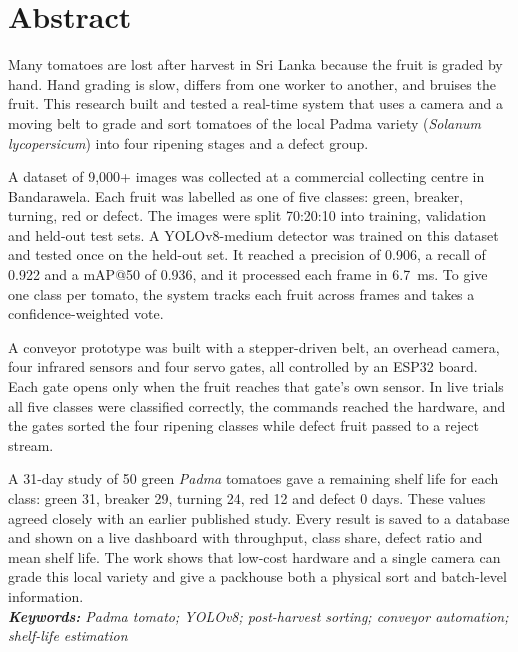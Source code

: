 \section*{Abstract}

Many tomatoes are lost after harvest in Sri Lanka because the fruit is graded by hand. Hand grading is slow, differs from one worker to another, and bruises the fruit. This research built and tested a real-time system that uses a camera and a moving belt to grade and sort tomatoes of the local Padma variety (\textit{Solanum lycopersicum}) into four ripening stages and a defect group.

A dataset of 9{,}000+ images was collected at a commercial collecting centre in Bandarawela. Each fruit was labelled as one of five classes: green, breaker, turning, red or defect. The images were split 70:20:10 into training, validation and held-out test sets. A YOLOv8-medium detector was trained on this dataset and tested once on the held-out set. It reached a precision of 0.906, a recall of 0.922 and a mAP@50 of 0.936, and it processed each frame in 6.7~ms. To give one class per tomato, the system tracks each fruit across frames and takes a confidence-weighted vote.

A conveyor prototype was built with a stepper-driven belt, an overhead camera, four infrared sensors and four servo gates, all controlled by an ESP32 board. Each gate opens only when the fruit reaches that gate's own sensor. In live trials all five classes were classified correctly, the commands reached the hardware, and the gates sorted the four ripening classes while defect fruit passed to a reject stream.

A 31-day study of 50 green \textit{Padma} tomatoes gave a remaining shelf life for each class: green 31, breaker 29, turning 24, red 12 and defect 0 days. These values agreed closely with an earlier published study. Every result is saved to a database and shown on a live dashboard with throughput, class share, defect ratio and mean shelf life. The work shows that low-cost hardware and a single camera can grade this local variety and give a packhouse both a physical sort and batch-level information. \\

\noindent \textit{\textbf{Keywords:} Padma tomato; YOLOv8; post-harvest sorting; conveyor automation; shelf-life estimation}

\clearpage
